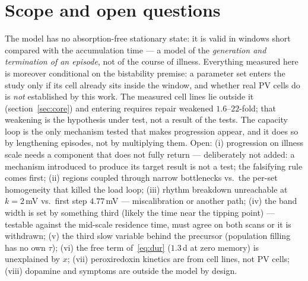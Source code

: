 \documentclass[11pt,a4paper]{article}
\theoremstyle{remark}
\begin{document}
\section{Scope and open questions}\label{sec:scope}
The model has no absorption-free stationary state: it is valid in windows short
compared with the accumulation time --- a model of the \emph{generation and termination
of an episode}, not of the course of illness. Everything measured here is moreover conditional on
the bistability premise: a parameter set enters the study only if its cell already sits inside the
window, and whether real PV cells do is \emph{not} established by this work. The measured cell
lines lie outside it (section~\ref{sec:core}) and entering requires repair weakened
$1.6$--$22$-fold; that weakening is the hypothesis under test, not a result of the tests. The capacity loop is the only mechanism
tested that makes progression appear, and it does so by lengthening episodes, not by
multiplying them. Open: (i) progression on illness scale needs a component that does
not fully return --- deliberately not added: a mechanism introduced to produce its
target result is not a test; the falsifying rule comes first; (ii) regions coupled
through narrow bottlenecks vs.\ the per-set homogeneity that killed the load loop;
(iii) rhythm breakdown unreachable at $k=2$\,mV vs.\ first step $4.77$\,mV ---
miscalibration or another path; (iv) the band width is set by something third (likely
the time near the tipping point) --- testable against the mid-scale residence time,
must agree on both scans or it is withdrawn; (v) the third slow variable behind the
precursor (population filling has no own $\tau$); (vi) the free term of~\eqref{eq:dur}
($1.3$\,d at zero memory) is unexplained by $x$; (vii) peroxiredoxin kinetics are from
cell lines, not PV cells; (viii) dopamine and symptoms are outside the model by design.

\smallskip
{}
\end{document}
